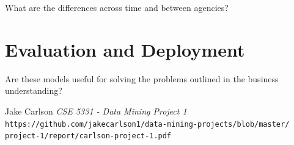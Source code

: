 \documentclass{article}
\begin{document}
What are the differences across time and between agencies?

\section{Evaluation and Deployment}
Are these models useful for solving the problems outlined in the business understanding?

\begin{thebibliography}{10}
    Jake Carlson
    \textit{CSE 5331 - Data Mining Project 1}
    \texttt{https://github.com/jakecarlson1/data-mining-projects/blob/master/}
    \texttt{project-1/report/carlson-project-1.pdf}

\end{thebibliography}
\end{document}
